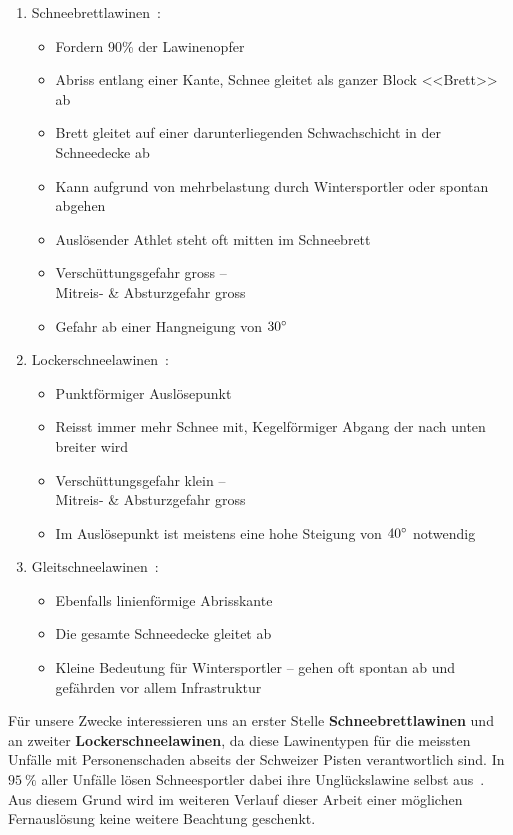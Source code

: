 \begin{enumerate}
  \item Schneebrettlawinen~\cite{sacbergspwinter}\cite{slfLawinentypen}:
  \begin{itemize}
    \item Fordern 90\% der Lawinenopfer
    \item Abriss entlang einer Kante, Schnee gleitet als ganzer Block <<Brett>> ab
    \item Brett gleitet auf einer darunterliegenden Schwachschicht in der Schneedecke ab
    \item Kann aufgrund von mehrbelastung durch Wintersportler oder spontan abgehen
    \item Auslösender Athlet steht oft mitten im Schneebrett
    \item Verschüttungsgefahr gross –\\ Mitreis- \& Absturzgefahr gross
    \item Gefahr ab einer Hangneigung von $30\degree$
  \end{itemize}
    
  \item Lockerschneelawinen~\cite{sacbergspwinter}\cite{slfLawinentypen}:
  \begin{itemize}
    \item Punktförmiger Auslösepunkt
    \item Reisst immer mehr Schnee mit, Kegelförmiger Abgang der nach unten breiter wird
    \item Verschüttungsgefahr klein –\\ Mitreis- \& Absturzgefahr gross
    \item Im Auslösepunkt ist meistens eine hohe Steigung von $40\degree$ notwendig
  \end{itemize}

  \item Gleitschneelawinen~\cite{sacbergspwinter}\cite{slfLawinentypen}:
  \begin{itemize}
    \item Ebenfalls linienförmige Abrisskante
    \item Die gesamte Schneedecke gleitet ab
    \item Kleine Bedeutung für Wintersportler – gehen oft spontan ab und gefährden vor allem Infrastruktur
  \end{itemize}
\end{enumerate}
Für unsere Zwecke interessieren uns an erster Stelle \textbf{Schneebrettlawinen} und an zweiter \textbf{Lockerschneelawinen}, da diese Lawinentypen für die meissten Unfälle mit Personenschaden abseits der Schweizer Pisten verantwortlich sind. In $\qty{95}{\percent}$ aller Unfälle lösen Schneesportler dabei ihre Unglückslawine selbst aus~\cite{ortovoxlabsnow}. Aus diesem Grund wird im weiteren Verlauf dieser Arbeit einer möglichen Fernauslösung keine weitere Beachtung geschenkt.

